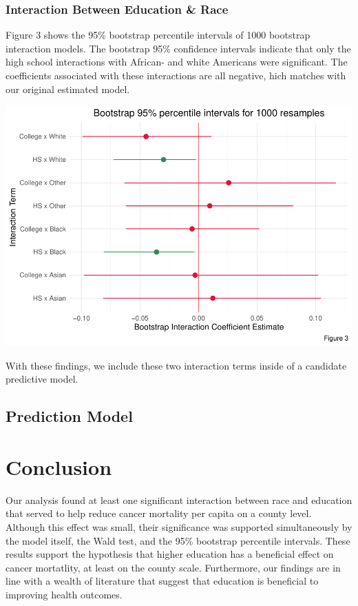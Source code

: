 \documentclass[
  11pt,
]{article}
\begin{document}
\hypertarget{interaction-between-education-race}{%
\subsubsection{Interaction Between Education \&
Race}\label{interaction-between-education-race}}

Figure 3 shows the 95\% bootstrap percentile intervals of 1000 bootstrap
interaction models. The bootstrap 95\% confidence intervals indicate
that only the high school interactions with African- and white Americans
were significant. The coefficients associated with these interactions
are all negative, hich matches with our original estimated model.

\begin{center}\includegraphics[width=0.7\linewidth]{report_files/figure-latex/bootstrap_table-1} \end{center}

With these findings, we include these two interaction terms inside of a
candidate predictive model.

\hypertarget{prediction-model-1}{%
\subsection{Prediction Model}\label{prediction-model-1}}

\hypertarget{conclusion}{%
\section{Conclusion}\label{conclusion}}

Our analysis found at least one significant interaction between race and
education that served to help reduce cancer mortality per capita on a
county level. Although this effect was small, their significance was
supported simultaneously by the model itself, the Wald test, and the
95\% bootstrap percentile intervals. These results support the
hypothesis that higher education has a beneficial effect on cancer
mortatlity, at least on the county scale. Furthermore, our findings are
in line with a wealth of literature that suggest that education is
beneficial to improving health outcomes.
\end{document}
